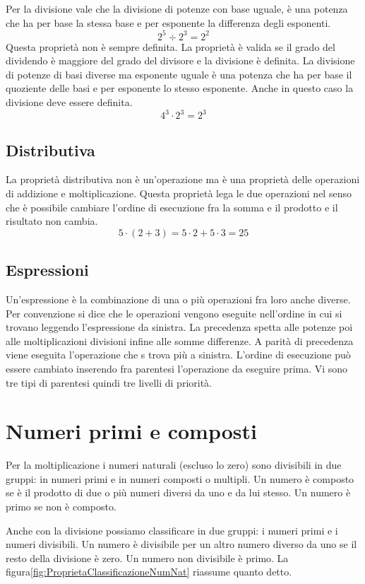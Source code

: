 Per la divisione vale che la divisione di potenze con base uguale, è una potenza che ha per base la stessa base e per esponente la differenza degli esponenti.\[ 2^5\div 2^3=2^2 \]Questa proprietà non è sempre definita. La proprietà è valida se il grado del dividendo è maggiore del grado del divisore e la divisione è definita.  La divisione di potenze di basi diverse ma esponente uguale è una potenza che ha per base il quoziente delle basi e per esponente lo stesso esponente. Anche in questo caso la divisione deve essere definita.\[4^3\cdot 2^3=2^3\] 
\subsection{Distributiva}
\label{sec:distibutivaInN}
La proprietà distributiva non è un'operazione ma è una proprietà delle operazioni di addizione e moltiplicazione. Questa proprietà lega le due operazioni nel senso che è possibile cambiare l'ordine di esecuzione fra la somma e il prodotto e il risultato non cambia. \[ 5\cdot(2+3)=5\cdot 2+ 5\cdot 3=25\]
\subsection{Espressioni}
\label{sec:EspressioniNumeri Naturali}
Un'espressione è la combinazione di una o più operazioni fra loro anche diverse. Per convenzione si dice che le operazioni vengono eseguite nell'ordine in cui si trovano leggendo l'espressione da sinistra. La precedenza spetta alle potenze poi alle moltiplicazioni divisioni infine alle somme differenze. A parità di precedenza viene eseguita l'operazione che s trova più a sinistra. L'ordine di esecuzione può essere  cambiato inserendo fra parentesi l'operazione da eseguire prima. Vi sono tre tipi di parentesi quindi tre livelli di priorità.
\section{Numeri primi e composti}
\label{sec:Numeriprimiecomposti}
Per la moltiplicazione i numeri naturali (escluso lo zero) sono divisibili in due gruppi: in numeri primi e in numeri composti o multipli. Un numero è composto se è il prodotto di due o più numeri diversi da uno e da lui stesso. Un numero è primo se non è composto. 

Anche con la divisione possiamo classificare in due gruppi: i numeri primi e i numeri divisibili. Un numero è divisibile per un altro numero diverso da uno se il resto della divisione è zero. Un numero non divisibile è primo. La figura\nobs\vref{fig:ProprietaClassificazioneNumNat} riassume quanto detto.

